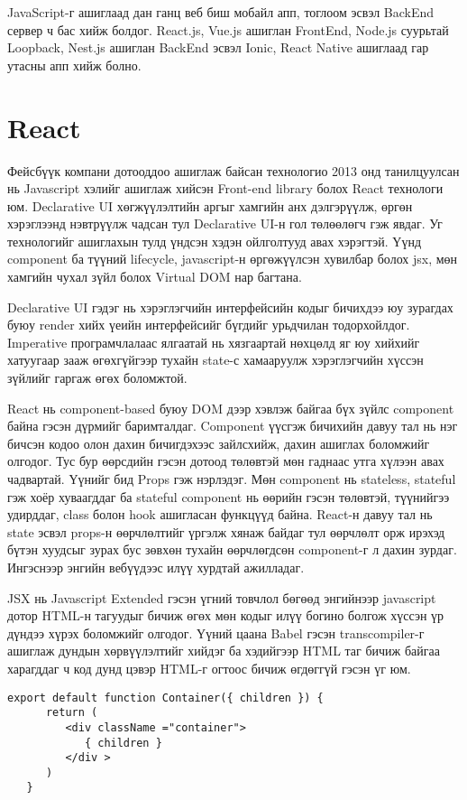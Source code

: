 JavaScript-г ашиглаад дан ганц веб биш мобайл апп, тоглоом эсвэл BackEnd сервер ч бас хийж болдог. React.js, Vue.js ашиглан FrontEnd, Node.js суурьтай Loopback, Nest.js ашиглан BackEnd эсвэл Ionic, React Native ашиглаад гар утасны апп хийж болно.

\section{React}
Фейсбүүк компани дотооддоо ашиглаж байсан технологио 2013 онд танилцуулсан нь Javascript хэлийг ашиглаж хийсэн Front-end library болох React технологи юм. Declarative UI хөгжүүлэлтийн аргыг хамгийн анх дэлгэрүүлж, өргөн хэрэглээнд нэвтрүүлж чадсан тул Declarative UI-н гол төлөөлөгч гэж явдаг. Уг технологийг ашиглахын тулд үндсэн хэдэн ойлголтууд авах хэрэгтэй. Үүнд component ба түүний lifecycle, javascript-н өргөжүүлсэн хувилбар болох jsx, мөн хамгийн чухал зүйл болох Virtual DOM нар багтана.

Declarative UI гэдэг нь хэрэглэгчийн интерфейсийн кодыг бичихдээ юу зурагдах буюу render хийх үеийн интерфейсийг бүгдийг урьдчилан тодорхойлдог. Imperative програмчлалаас ялгаатай нь хязгаартай нөхцөлд яг юу хийхийг хатуугаар зааж өгөхгүйгээр тухайн state-с хамааруулж хэрэглэгчийн хүссэн зүйлийг гаргаж өгөх боломжтой.

React нь component-based буюу DOM дээр хэвлэж байгаа бүх зүйлс component байна гэсэн дүрмийг баримталдаг. Component үүсгэж бичихийн давуу тал нь нэг бичсэн кодоо олон дахин бичигдэхээс зайлсхийж, дахин ашиглах боломжийг олгодог. Тус бур өөрсдийн гэсэн дотоод төлөвтэй мөн гаднаас утга хүлээн авах чадвартай. Үүнийг бид Props гэж нэрлэдэг. Мөн component нь stateless, stateful гэж хоёр хуваагддаг ба stateful component нь өөрийн гэсэн төлөвтэй, түүнийгээ удирддаг, class болон hook ашигласан функцүүд байна. React-н давуу тал нь state эсвэл props-н өөрчлөлтийг үргэлж хянаж байдаг тул өөрчлөлт орж ирэхэд бүтэн хуудсыг зурах бус зөвхөн тухайн өөрчлөгдсөн component-г л дахин зурдаг. Ингэснээр энгийн вебүүдээс илүү хурдтай ажилладаг.

JSX нь Javascript Extended гэсэн үгний товчлол бөгөөд энгийнээр javascript дотор HTML-н тагуудыг бичиж өгөх мөн кодыг илүү богино болгож хүссэн үр дүндээ хүрэх боломжийг олгодог. Үүний цаана Babel гэсэн transcompiler-г ашиглаж дундын хөрвүүлэлтийг хийдэг ба хэдийгээр HTML таг бичиж байгаа харагддаг ч код дунд цэвэр HTML-г огтоос бичиж өгдөггүй гэсэн үг юм.

\begin{lstlisting}[caption=JSX ашиглаж ”container” класстай html элемент буцаах компонент, frame=single]
   export default function Container({ children }) {
      return (
         <div className ="container">
            { children }
         </div >
      )
   }
\end{lstlisting}

